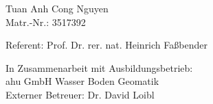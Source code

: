 \documentclass[a4paper,12pt]{scrreprt}
\begin{document}
\begin{titlepage}
		\vspace{1.5cm}
		
		\begin{minipage}[t]{9cm}
			\centering Tuan Anh Cong Nguyen \\ Matr.-Nr.: 3517392
		\end{minipage}
		\vspace{2.1cm}
		
		\centering \begin{minipage}[b]{15cm}
			\centering
			Referent: Prof. Dr. rer. nat. Heinrich Faßbender\\
		\end{minipage}
		
		
		\vspace{1.5cm}
		
		\centering %
		\begin{minipage}[b]{10cm}
			\centering
			In Zusammenarbeit mit Ausbildungsbetrieb:\\
			ahu GmbH Wasser Boden Geomatik \\
			\vspace{1cm}
			Externer Betreuer: Dr. David Loibl
			
		\end{minipage}
		
		\restoregeometry
	\end{titlepage}
	
	\clearpage %
\end{document}
